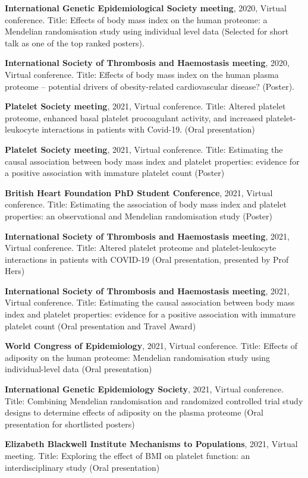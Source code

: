 \documentclass[11pt,twoside]{bristolthesis}
\begin{document}
\textbf{International Genetic Epidemiological Society meeting}, 2020, Virtual conference. Title: Effects of body mass index on the human proteome: a Mendelian randomisation study using individual level data (Selected for short talk as one of the top ranked posters).

\textbf{International Society of Thrombosis and Haemostasis meeting}, 2020, Virtual conference. Title: Effects of body mass index on the human plasma proteome -- potential drivers of obesity-related cardiovascular disease? (Poster).

\textbf{Platelet Society meeting}, 2021, Virtual conference. Title: Altered platelet proteome, enhanced basal platelet procoagulant activity, and increased platelet-leukocyte interactions in patients with Covid-19. (Oral presentation)

\textbf{Platelet Society meeting}, 2021, Virtual conference. Title: Estimating the causal association between body mass index and platelet properties: evidence for a positive association with immature platelet count (Poster)

\textbf{British Heart Foundation PhD Student Conference}, 2021, Virtual conference. Title: Estimating the association of body mass index and platelet properties: an observational and Mendelian randomisation study (Poster)

\textbf{International Society of Thrombosis and Haemostasis meeting}, 2021, Virtual conference. Title: Altered platelet proteome and platelet-leukocyte interactions in patients with COVID-19 (Oral presentation, presented by Prof Hers)

\textbf{International Society of Thrombosis and Haemostasis meeting}, 2021, Virtual conference. Title: Estimating the causal association between body mass index and platelet properties: evidence for a positive association with immature platelet count (Oral presentation and Travel Award)

\textbf{World Congress of Epidemiology}, 2021, Virtual conference. Title: Effects of adiposity on the human proteome: Mendelian randomisation study using individual-level data (Oral presentation)

\textbf{International Genetic Epidemiology Society}, 2021, Virtual conference. Title: Combining Mendelian randomisation and randomized controlled trial study designs to determine effects of adiposity on the plasma proteome (Oral presentation for shortlisted posters)

\textbf{Elizabeth Blackwell Institute Mechanisms to Populations}, 2021, Virtual meeting. Title: Exploring the effect of BMI on platelet function: an interdisciplinary study (Oral presentation)
\end{document}
